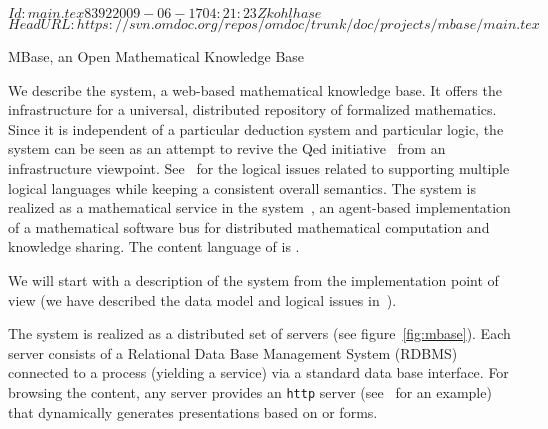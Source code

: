 \svnInfo $Id: main.tex 8392 2009-06-17 04:21:23Z kohlhase $
\svnKeyword $HeadURL: https://svn.omdoc.org/repos/omdoc/trunk/doc/projects/mbase/main.tex $

\begin{omgroup}[id=mbase,short=MBase,creators={miko,afranke}]
{MBase, an Open Mathematical Knowledge Base}

We describe the {\mbase} system, a web-based mathematical knowledge base. It offers the
infrastructure for a universal, distributed repository of formalized mathematics. Since it
is independent of a particular deduction system and particular logic, the {\mbase} system
can be seen as an attempt to revive the {\sc Qed} initiative~\cite{qed} from an infrastructure
viewpoint. See~\cite{KohFra:rkcimss01} for the logical issues related to supporting
multiple logical languages while keeping a consistent overall semantics. The system is
realized as a mathematical service in the {\mathweb}
system~\cite{FraKoh:mabdl99,ZimmerMICAI04}, an agent-based implementation of a
mathematical software bus for distributed mathematical computation and knowledge
sharing. The content language of {\mbase} is {\omdoc}.

We will start with a description of the system from the implementation point of
view (we have described the data model and logical issues
in~\cite{KohFra:rkcimss01}).  

The {\mbase} system is realized as a distributed set of {\mbase} servers (see
figure~\ref{fig:mbase}). Each {\mbase} server consists of a Relational Data Base
Management System (RDBMS) connected to a {\mozart} process (yielding a {\mathweb} service)
via a standard data base interface.  For browsing the {\mbase} content, any {\mbase}
server provides an {\tt http} server (see~\cite{MBase-Demo:URL} for an example) that
dynamically generates presentations based on {\html} or {\xml} forms.


\end{omgroup}
